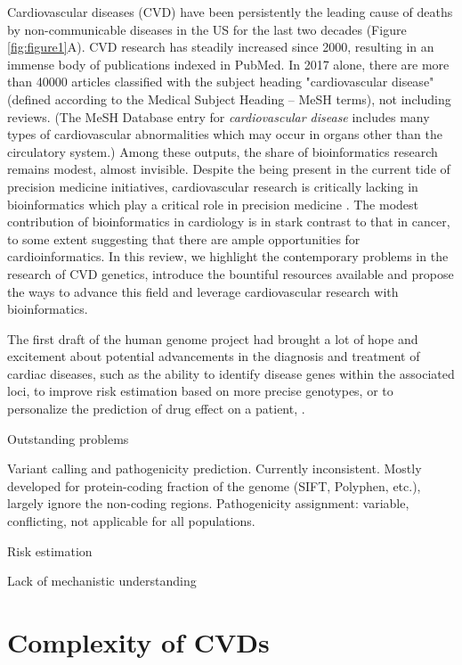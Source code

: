 \documentclass[letter]{bioinfo}
\begin{document}
Cardiovascular diseases (CVD) have been persistently the leading cause of deaths by non-communicable diseases in the US for the last two decades (Figure \ref{fig:figure1}A). CVD research has steadily increased since 2000, resulting in an immense body of publications indexed in PubMed. In 2017 alone, there are more than 40000 articles classified with the subject heading "cardiovascular disease" (defined according to the Medical Subject Heading -- MeSH terms), not including reviews. (The MeSH Database entry for \textit{cardiovascular disease} includes many types of cardiovascular abnormalities which may occur in organs other than the circulatory system.) Among these outputs, the share of bioinformatics research remains modest, almost invisible. Despite the being present in the current tide of precision medicine initiatives, cardiovascular research is critically lacking in bioinformatics which play a critical role in precision medicine \citep{Gomez-Lopez:2017:Precision}.  The modest contribution of bioinformatics in cardiology is in stark contrast to that in cancer, to some extent suggesting that there are ample opportunities for cardioinformatics. In this review, we highlight the contemporary problems in the research of CVD genetics, introduce the bountiful resources available and propose the ways to advance this field and leverage cardiovascular research with bioinformatics.

The first draft of the human genome project had brought a lot of hope and excitement about potential advancements in the diagnosis and treatment of cardiac diseases, such as the ability to identify disease genes within the associated loci, to improve risk estimation based on more precise genotypes, or to personalize the prediction of drug effect on a patient, \citep{Komajda:2001:heart}.


Outstanding problems

Variant calling and pathogenicity prediction. Currently inconsistent. Mostly developed for protein-coding fraction of the genome (SIFT, Polyphen, etc.), largely ignore the non-coding regions.
Pathogenicity assignment: variable, conflicting, not applicable for all populations.

Risk estimation

Lack of mechanistic understanding




\section{Complexity of CVDs}
\end{document}

